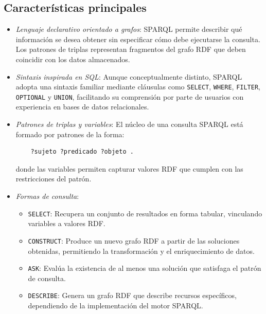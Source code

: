 \documentclass{article}
\begin{document}
\subsection{Características principales}

\begin{itemize}
    \item \textit{Lenguaje declarativo orientado a grafos}:  
    SPARQL permite describir qué información se desea obtener sin especificar cómo debe ejecutarse la consulta. Los patrones de triplas representan fragmentos del grafo RDF que deben coincidir con los datos almacenados.

    \item \textit{Sintaxis inspirada en SQL}:  
    Aunque conceptualmente distinto, SPARQL adopta una sintaxis familiar mediante cláusulas como \texttt{SELECT}, \texttt{WHERE}, \texttt{FILTER}, \texttt{OPTIONAL} y \texttt{UNION}, facilitando su comprensión por parte de usuarios con experiencia en bases de datos relacionales.

    \item \textit{Patrones de triplas y variables}:  
    El núcleo de una consulta SPARQL está formado por patrones de la forma:
    \begin{verbatim}
    ?sujeto ?predicado ?objeto .
    \end{verbatim}
    donde las variables permiten capturar valores RDF que cumplen con las restricciones del patrón.

    \item \textit{Formas de consulta}:
    \begin{itemize}
        \item \texttt{SELECT}: Recupera un conjunto de resultados en forma tabular, vinculando variables a valores RDF.
        \item \texttt{CONSTRUCT}: Produce un nuevo grafo RDF a partir de las soluciones obtenidas, permitiendo la transformación y el enriquecimiento de datos.
        \item \texttt{ASK}: Evalúa la existencia de al menos una solución que satisfaga el patrón de consulta.
        \item \texttt{DESCRIBE}: Genera un grafo RDF que describe recursos específicos, dependiendo de la implementación del motor SPARQL.
    \end{itemize}


\end{itemize}
\end{document}
